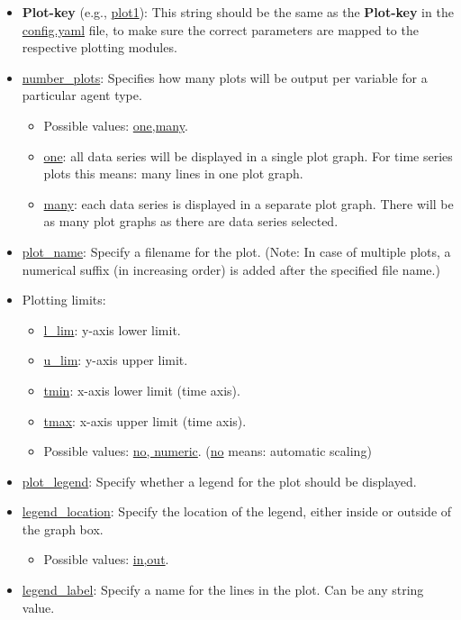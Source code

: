 \documentclass[10pt,a4paper]{article}
\begin{document}
\begin{itemize}
\item \textbf{Plot-key} (e.g., \url{plot1}): This string should be the same as the \textbf{Plot-key} in the \url{config.yaml} file, to make sure the correct parameters are mapped to the respective plotting modules.

\item \url{number_plots}: Specifies how many plots will be output per variable for a particular agent type. 
\begin{itemize}
\item Possible values: \url{one,many}.
\item \url{one}: all data series will be displayed in a single plot graph. For time series plots this means: many lines in one plot graph.
\item \url{many}: each data series is displayed in a separate plot graph. There will be as many plot graphs as there are data series selected.
\end{itemize}

\item \url{plot_name}: Specify a filename for the plot.
(Note: In case of multiple plots, a numerical suffix (in increasing order) is added after the specified file name.)

\item Plotting limits:
\begin{itemize}
\item \url{l_lim}: y-axis lower limit.
\item \url{u_lim}: y-axis upper limit. 
\item \url{tmin}:  x-axis lower limit (time axis).
\item \url{tmax}: x-axis upper limit (time axis).
\item Possible values: \url{no, numeric}. (\url{no} means: automatic scaling)
\end{itemize}

\item \url{plot_legend}: Specify whether a legend for the plot should be displayed.

\item \url{legend_location}: Specify the location of the legend, either inside or outside of the graph box.
\begin{itemize}
\item Possible values: \url{in,out}.
\end{itemize}

\item \url{legend_label}: Specify a name for the lines in the plot. Can be any string value.


\end{itemize}
\end{document}
